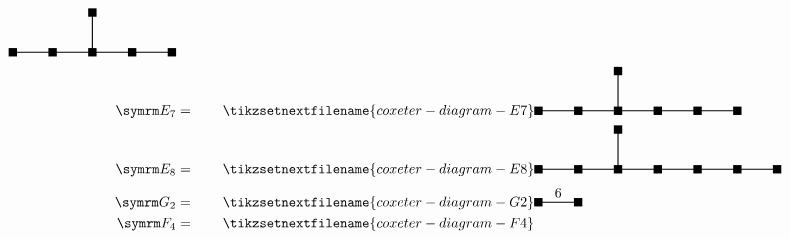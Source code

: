 \begin{align}
\begin{tikzpicture}[coxeter node/.style = {fill, inner sep=3pt}, coxeter wire/.style = {thick}, baseline=-0.1cm]
        \draw [coxeter wire] (0, 0) -- ++ (4, 0);
        \draw [coxeter wire] (2, 0) -- ++ (0, 1);
        \node [coxeter node] at (0, 0) {};
        \node [coxeter node] at (1, 0) {};
        \node [coxeter node] at (2, 0) {};
        \node [coxeter node] at (3, 0) {};
        \node [coxeter node] at (4, 0) {};
        \node [coxeter node] at (2, 1) {};
    \end{tikzpicture}
    \\
    \E[7] &= \qquad
    \tikzsetnextfilename{coxeter-diagram-E7}
    \begin{tikzpicture}[coxeter node/.style = {fill, inner sep=3pt}, coxeter wire/.style = {thick}, baseline=-0.1cm]
        \draw [coxeter wire] (0, 0) -- ++ (5, 0);
        \draw [coxeter wire] (2, 0) -- ++ (0, 1);
        \node [coxeter node] at (0, 0) {};
        \node [coxeter node] at (1, 0) {};
        \node [coxeter node] at (2, 0) {};
        \node [coxeter node] at (3, 0) {};
        \node [coxeter node] at (4, 0) {};
        \node [coxeter node] at (5, 0) {};
        \node [coxeter node] at (2, 1) {};
    \end{tikzpicture}
    \\
    \E[8] &= \qquad
    \tikzsetnextfilename{coxeter-diagram-E8}
    \begin{tikzpicture}[coxeter node/.style = {fill, inner sep=3pt}, coxeter wire/.style = {thick}, baseline=-0.1cm]
        \draw [coxeter wire] (0, 0) -- ++ (6, 0);
        \draw [coxeter wire] (2, 0) -- ++ (0, 1);
        \node [coxeter node] at (0, 0) {};
        \node [coxeter node] at (1, 0) {};
        \node [coxeter node] at (2, 0) {};
        \node [coxeter node] at (3, 0) {};
        \node [coxeter node] at (4, 0) {};
        \node [coxeter node] at (5, 0) {};
        \node [coxeter node] at (6, 0) {};
        \node [coxeter node] at (2, 1) {};
    \end{tikzpicture}
    \\
    \G[2] &= \qquad
    \tikzsetnextfilename{coxeter-diagram-G2}
    \begin{tikzpicture}[coxeter node/.style = {fill, inner sep=3pt}, coxeter wire/.style = {thick}]
        \draw [coxeter wire] (0, 0) -- ++ (1, 0);
        \node [above] at (0.5, 0) {\(6\)};
        \node [coxeter node] at (0, 0) {};
        \node [coxeter node] at (1, 0) {};
    \end{tikzpicture}
    \\
    \F[4] &= \qquad
    \tikzsetnextfilename{coxeter-diagram-F4}
    \begin{tikzpicture}[coxeter node/.style = {fill, inner sep=3pt}, coxeter wire/.style = {thick}]

\end{tikzpicture}
\end{align}
